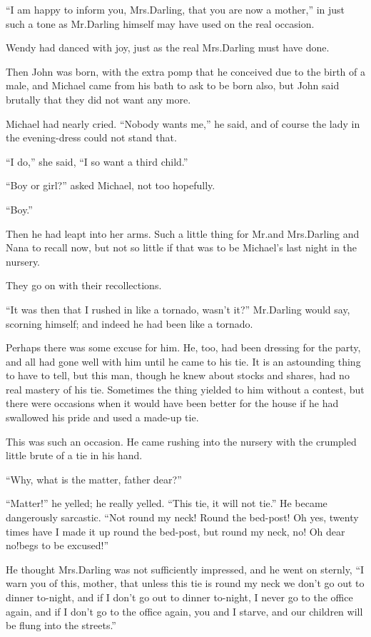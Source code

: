 “I am happy to inform you, Mrs.\@ Darling, that you are now a mother,”
in just such a tone as Mr.\@ Darling himself may have used on the real occasion.

Wendy had danced with joy, just as the real Mrs.\@ Darling must have done.

Then John was born, with the extra pomp that he conceived due to the birth of a male,
and Michael came from his bath to ask to be born also,
but John said brutally that they did not want any more.

Michael had nearly cried.
“Nobody wants me,” he said,
and of course the lady in the evening-dress could not stand that.

“I do,” she said, “I so want a third child.”

“Boy or girl?\@” asked Michael, not too hopefully.

“Boy.”

Then he had leapt into her arms.
Such a little thing for Mr.\@ and Mrs.\@ Darling and Nana to recall now,
but not so little if that was to be Michael’s last night in the nursery.

They go on with their recollections.

“It was then that I rushed in like a tornado, wasn’t it?\@” Mr.\@ Darling would say, scorning himself;
and indeed he had been like a tornado.

Perhaps there was some excuse for him.
He, too, had been dressing for the party,
and all had gone well with him until he came to his tie.
It is an astounding thing to have to tell,
but this man, though he knew about stocks and shares, had no real mastery of his tie.
Sometimes the thing yielded to him without a contest,
but there were occasions when it would have been better for the house
if he had swallowed his pride and used a made-up tie.

This was such an occasion.
He came rushing into the nursery with the crumpled little brute of a tie in his hand.

“Why, what is the matter, father dear?”

“Matter!\@” he yelled;
he really yelled.
“This tie, it will not tie.”
He became dangerously sarcastic.
“Not round my neck!
Round the bed-post!
Oh yes, twenty times have I made it up round the bed-post, but round my neck, no!
Oh dear no!\@ begs to be excused!”

He thought Mrs.\@ Darling was not sufficiently impressed, and he went on sternly,
“I warn you of this, mother, that unless this tie is round my neck we don’t go out to dinner to-night,
and if I don’t go out to dinner to-night, I never go to the office again,
and if I don’t go to the office again,
you and I starve, and our children will be flung into the streets.”

